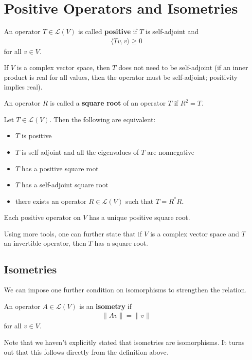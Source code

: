 \documentclass{memoir}
\begin{document}

\section{Positive Operators and Isometries}
\label{sec:positive_operators_and_isometries}
\begin{defn}
	An operator \(T \in \mathcal{L}(V)\) is called \textbf{positive} if \(T\) is self-adjoint and
	\begin{align*}
		\langle Tv, v \rangle \geq 0
	\end{align*}
	for all \(v \in V\).
\end{defn}
If \(V\) is a complex vector space, then \(T\) does not need to be self-adjoint (if an inner product is real for all values, then the operator must be self-adjoint; positivity implies real).
\begin{defn}
	An operator \(R\) is called a \textbf{square root} of an operator \(T\) if \(R^2 = T\).
\end{defn}
\begin{lemma}
	Let \(T \in \mathcal{L}(V)\). Then the following are equivalent:
	\begin{itemize}
		\item \(T\) is positive
		\item \(T\) is self-adjoint and all the eigenvalues of \(T\) are nonnegative
		\item \(T\) has a positive square root
		\item \(T\) has a self-adjoint square root
		\item there exists an operator \(R \in \mathcal{L}(V)\) such that \(T = R^{*}R\).
	\end{itemize}
\end{lemma}
\begin{cor}
	Each positive operator on \(V\) has a unique positive square root.
\end{cor}

Using more tools, one can further state that if \(V\) is a complex vector space and \(T\) an invertible operator, then \(T\) has a square root.

\subsection{Isometries}
\label{subsec:isometries}

We can impose one further condition on isomorphisms to strengthen the relation.
\begin{defn}[Isometry]
	An operator \(A \in \mathcal{L}(V)\) is an \textbf{isometry} if
	\begin{align*}
		\|Av\| = \|v\|
	\end{align*}
	for all \(v \in V\).
\end{defn}
Note that we haven't explicitly stated that isometries are isomorphisms. It turns out that this follows directly from the definition above.
\end{document}
